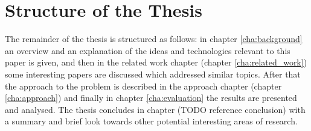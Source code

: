 \section{Structure of the Thesis}
\label{sec:structure}

The remainder of the thesis is structured as follows: in chapter \ref{cha:background} an overview and an explanation of the ideas and technologies relevant to this paper is given, and then in the related work chapter (chapter \ref{cha:related_work}) some interesting papers are discussed which addressed similar topics. After that the approach to the problem is described in the approach chapter (chapter \ref{cha:approach}) and finally in chapter \ref{cha:evaluation} the results are presented and analysed. The thesis concludes in chapter (TODO reference conclusion) with a summary and brief look towards other potential interesting areas of research.%
